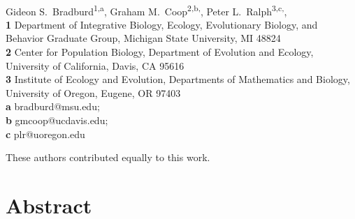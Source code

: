 \documentclass[10pt,letterpaper]{article}
\date{}
\begin{document}
\vspace*{0.2in}

\begin{flushleft}
{\Large
\textbf{}
}
\newline
\\
Gideon S.\  Bradburd\textsuperscript{1,a},
Graham M.\  Coop\textsuperscript{2,b,\Yinyang},
Peter L.\  Ralph\textsuperscript{3,c,\Yinyang},
\\
\bigskip
\textbf{1}
Department of Integrative Biology, 
Ecology, Evolutionary Biology, and Behavior Graduate Group,
Michigan State University, MI 48824
\\
\textbf{2}
Center for Population Biology,
Department of Evolution and Ecology, 
University of California, Davis, CA 95616
\\
\textbf{3} 
Institute of Ecology and Evolution,
Departments of Mathematics and Biology,
University of Oregon, Eugene, OR 97403
\\
\textbf{a} bradburd@msu.edu; \\
\textbf{b} gmcoop@ucdavis.edu;\\
\textbf{c} plr@uoregon.edu\\

\bigskip

%
\Yinyang These authors contributed equally to this work.

\end{flushleft}
\section*{Abstract}
\end{document}

